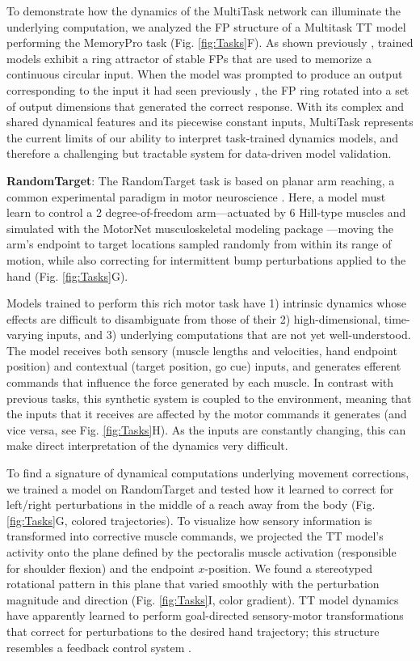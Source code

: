 \documentclass{article}
\begin{document}
To demonstrate how the dynamics of the MultiTask network can illuminate the underlying computation, we analyzed the FP structure of a Multitask TT model performing the MemoryPro task (Fig. \ref{fig:Tasks}F). As shown previously \cite{yang_task_2019}, trained models exhibit a ring attractor of stable FPs that are used to memorize a continuous circular input. When the model was prompted to produce an output corresponding to the input it had seen previously \cite{driscoll_flexible_2022}, the FP ring rotated into a set of output dimensions that generated the correct response. With its complex and shared dynamical features and its piecewise constant inputs, MultiTask represents the current limits of our ability to interpret task-trained dynamics models, and therefore a challenging but tractable system for data-driven model validation.

\textbf{RandomTarget}:
The RandomTarget task is based on planar arm reaching, a common experimental paradigm in motor neuroscience \cite{georgopoulos1986neuronal, perich2018neural}. Here, a model must learn to control a 2 degree-of-freedom arm—actuated by 6 Hill-type muscles and simulated with the MotorNet musculoskeletal modeling package \cite{codol_motornet_2024}—moving the arm’s endpoint to target locations sampled randomly from within its range of motion, while also correcting for intermittent bump perturbations applied to the hand (Fig. \ref{fig:Tasks}G).

Models trained to perform this rich motor task have 1) intrinsic dynamics whose effects are difficult to disambiguate from those of their 2) high-dimensional, time-varying inputs, and 3) underlying computations that are not yet well-understood. The model receives both sensory (muscle lengths and velocities, hand endpoint position) and contextual (target position, go cue) inputs, and generates efferent commands that influence the force generated by each muscle. In contrast with previous tasks, this synthetic system is coupled to the environment, meaning that the inputs that it receives are affected by the motor commands it generates (and vice versa, see Fig. \ref{fig:Tasks}H). As the inputs are constantly changing, this can make direct interpretation of the dynamics very difficult.

To find a signature of dynamical computations underlying movement corrections, we trained a model on RandomTarget and tested how it learned to correct for left/right perturbations in the middle of a reach away from the body (Fig. \ref{fig:Tasks}G, colored trajectories). To visualize how sensory information is transformed into corrective muscle commands, we projected the TT model’s activity onto the plane defined by the pectoralis muscle activation (responsible for shoulder flexion) and the endpoint $x$-position. We found a stereotyped rotational pattern in this plane that varied smoothly with the perturbation magnitude and direction (Fig. \ref{fig:Tasks}I, color gradient). TT model dynamics have apparently learned to perform goal-directed sensory-motor transformations that correct for perturbations to the desired hand trajectory; this structure resembles a feedback control system \cite{kalidindi2021rotational}.
\end{document}

